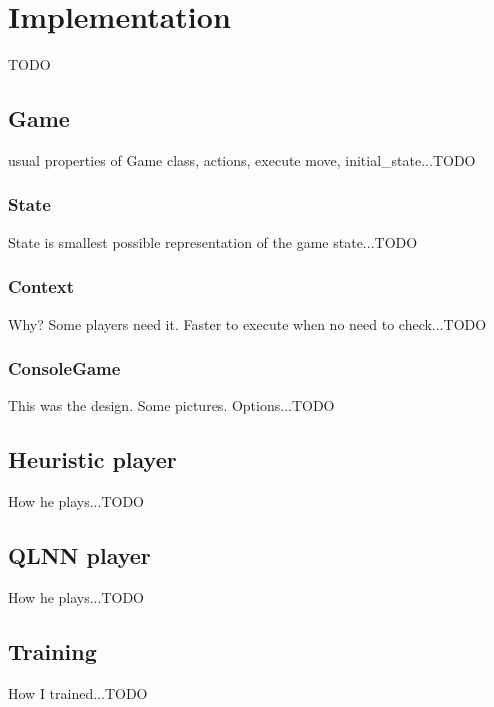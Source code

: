 \chapter{Implementation}\label{chap:4}
TODO

\section{Game}
  usual properties of Game class, actions, execute move, initial\_state...TODO

  \subsection{State}
  State is smallest possible representation of the game state...TODO

  \subsection{Context}
  Why? Some players need it. Faster to execute when no need to check...TODO

  \subsection{ConsoleGame}
  This was the design. Some pictures. Options...TODO

\section{Heuristic player}
  How he plays...TODO

\section{QLNN player}
  How he plays...TODO

\section{Training}
  How I trained...TODO
